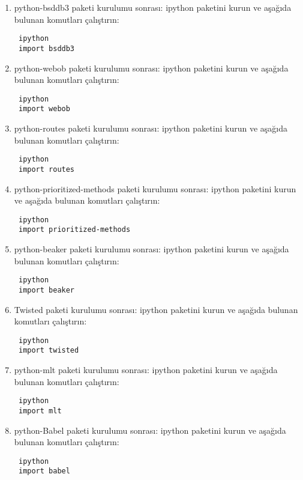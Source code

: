 \documentclass[a4paper,10pt]{article}
\begin{document}
\begin{enumerate}
\item python-bsddb3 paketi kurulumu sonrası:
ipython paketini kurun ve aşağıda bulunan komutları çalıştırın:
\begin{verbatim}
 ipython
 import bsddb3
\end{verbatim}

\item python-webob paketi kurulumu sonrası:
ipython paketini kurun ve aşağıda bulunan komutları çalıştırın:
\begin{verbatim}
 ipython
 import webob
\end{verbatim}

\item python-routes paketi kurulumu sonrası:
ipython paketini kurun ve aşağıda bulunan komutları çalıştırın:
\begin{verbatim}
 ipython
 import routes
\end{verbatim}


\item python-prioritized-methods paketi kurulumu sonrası:
ipython paketini kurun ve aşağıda bulunan komutları çalıştırın:
\begin{verbatim}
 ipython
 import prioritized-methods
\end{verbatim}


\item python-beaker paketi kurulumu sonrası:
ipython paketini kurun ve aşağıda bulunan komutları çalıştırın:
\begin{verbatim}
 ipython
 import beaker
\end{verbatim}

\item Twisted paketi kurulumu sonrası:
ipython paketini kurun ve aşağıda bulunan komutları çalıştırın:
\begin{verbatim}
 ipython
 import twisted
\end{verbatim}

\item python-mlt paketi kurulumu sonrası:
ipython paketini kurun ve aşağıda bulunan komutları çalıştırın:
\begin{verbatim}
 ipython
 import mlt
\end{verbatim}


\item python-Babel paketi kurulumu sonrası:
ipython paketini kurun ve aşağıda bulunan komutları çalıştırın:
\begin{verbatim}
 ipython
 import babel
\end{verbatim}


\end{enumerate}
\end{document}
